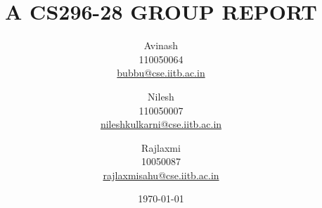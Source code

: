 \documentclass[a4paper,11pt]{article}
\begin{document}
\title{ A CS296-28 GROUP REPORT }
\author{
	Avinash\\
	110050064\\
	\href{mailto:bubbu@cse.iitb.ac.in}{bubbu@cse.iitb.ac.in}\\
	\and 
	Nilesh\\
	110050007\\
	\href{mailto:nileshkulkarni@cse.iitb.ac.in}{nileshkulkarni@cse.iitb.ac.in}\\
	\and
	Rajlaxmi\\
	10050087\\
	\href{mailto:rajlaxmisahu@cse.iitb.ac.in}{rajlaxmisahu@cse.iitb.ac.in}\\
	}
\date{\today}
\maketitle
{}
\tableofcontents	
\newpage
{}
\end{document}
